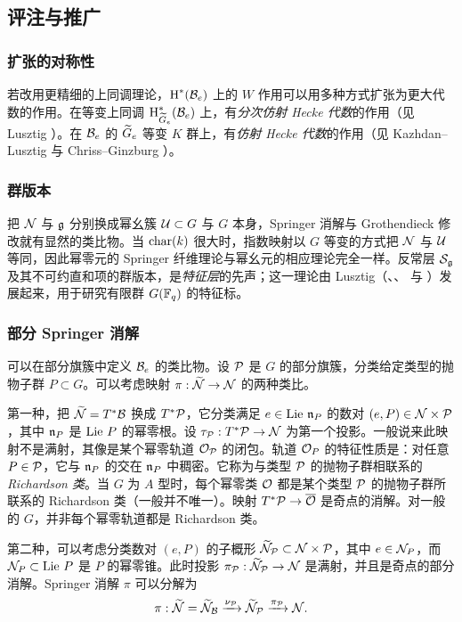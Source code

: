 \subsection{评注与推广}

\subsubsection{扩张的对称性} 若改用更精细的上同调理论，$\textup{H}^{*}({\mathcal{B}_{e}})$ 上的 $W$ 作用可以用多种方式扩张为更大代数的作用。在等变上同调 $\textup{H}^{*}_{\widetilde{G}_{e}}(\mathcal{B}_{e})$ 上，有{\em 分次仿射 Hecke 代数}的作用（见 Lusztig \cite{LuGrHk}）。在 $\mathcal{B}_{e}$ 的 $\widetilde{G}_{e}$ 等变 $K$ 群上，有{\em 仿射 Hecke 代数}的作用（见 Kazhdan--Lusztig \cite{KLAffHk} 与 Chriss--Ginzburg \cite{CG}）。

\subsubsection{群版本} 把 $\mathcal{N}$ 与 $\mathfrak{g}$ 分别换成幂幺簇 $\mathcal{U}\subset G$ 与 $G$ 本身，Springer 消解与 Grothendieck 修改就有显然的类比物。当 $\textup{char}(k)$ 很大时，指数映射以 $G$ 等变的方式把 $\mathcal{N}$ 与 $\mathcal{U}$ 等同，因此幂零元的 Springer 纤维理论与幂幺元的相应理论完全一样。反常层 $\mathcal{S}_{\mathfrak{g}}$ 及其不可约直和项的群版本，是{\em 特征层}的先声；这一理论由 Lusztig（\cite{LuChShI}、\cite{LuChShII}、\cite{LuChShIV} 与 \cite{LuChShV}）发展起来，用于研究有限群 $G(\mathbb{F}_{q})$ 的特征标。

\subsubsection{部分 Springer 消解}\label{sss:partial Spr} 可以在部分旗簇中定义 $\mathcal{B}_{e}$ 的类比物。设 $\mathcal{P}$ 是 $G$ 的部分旗簇，分类给定类型的抛物子群 $P\subset G$。可以考虑映射 $\pi:\widetilde{\mathcal{N}}\to\mathcal{N}$ 的两种类比。

第一种，把 $\widetilde{\mathcal{N}}=T^{*}\mathcal{B}$ 换成 $T^{*}\mathcal{P}$，它分类满足 $e\in \textup{Lie}\ \mathfrak{n}_{P}$ 的数对 $(e, P)\in\mathcal{N}\times\mathcal{P}$，其中 $\mathfrak{n}_{P}$ 是 $\textup{Lie}\  P$ 的幂零根。设 $\tau_{\mathcal{P}}: T^{*}\mathcal{P}\to\mathcal{N}$ 为第一个投影。一般说来此映射不是满射，其像是某个幂零轨道 $\mathcal{O}_{\mathcal{P}}$ 的闭包。轨道 $\mathcal{O}_{P}$ 的特征性质是：对任意 $P\in\mathcal{P}$，它与 $\mathfrak{n}_{P}$ 的交在 $\mathfrak{n}_{P}$ 中稠密。它称为与类型 $\mathcal{P}$ 的抛物子群相联系的{\em Richardson 类}。当 $G$ 为 $A$ 型时，每个幂零类 $\mathcal{O}$ 都是某个类型 $\mathcal{P}$ 的抛物子群所联系的 Richardson 类（一般并不唯一）。映射 $T^{*}\mathcal{P}\to \overline{\mathcal{O}}$ 是奇点的消解。对一般的 $G$，并非每个幂零轨道都是 Richardson 类。

第二种，可以考虑分类数对 $(e,P)$ 的子概形 $\widetilde{\mathcal{N}}_{\mathcal{P}}\subset\mathcal{N}\times \mathcal{P}$，其中 $e\in\mathcal{N}_{P}$，而 $\mathcal{N}_{P}\subset\textup{Lie}\  P$ 是 $P$ 的幂零锥。此时投影 $\pi_{\mathcal{P}}: \widetilde{\mathcal{N}}_{\mathcal{P}}\to \mathcal{N}$ 是满射，并且是奇点的部分消解。Springer 消解 $\pi$ 可以分解为
\begin{equation*}
\pi: \widetilde{\mathcal{N}}=\widetilde{\mathcal{N}}_{\mathcal{B}}\xrightarrow{\nu_{\mathcal{P}}}\widetilde{\mathcal{N}}_{\mathcal{P}}\xrightarrow{\pi_{\mathcal{P}}} \mathcal{N}.
\end{equation*}

